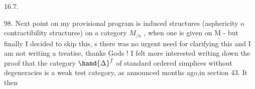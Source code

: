 16.7.

98. Next point on my provisional program is induced structures
(asphericity o contractibility structures) on a category $M_{/a}$ , when
one is given on M - but finally I decided to skip this, s there was
no urgent need for clarifying this and I am not writing a treatise,
thanks Gods ! I felt more interested writing down the proof that the
category $\hand{\Delta}^{f}$ of standard ordered simplices without degeneracies is a
weak test category, as announced months ago,in section 43. It then


